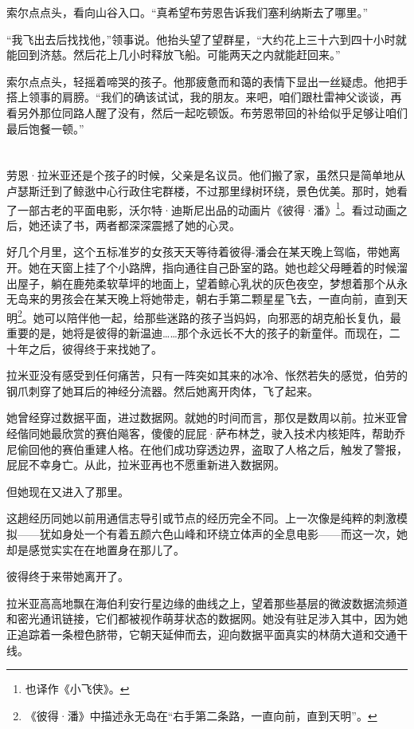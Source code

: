\documentclass[AutoFakeBold=true]{book}
\begin{document}
索尔点点头，看向山谷入口。``真希望布劳恩告诉我们塞利纳斯去了哪里。''

``我飞出去后找找他，''领事说。他抬头望了望群星，``大约花上三十六到四十小时就能回到济慈。然后花上几小时释放飞船。可能两天之内就能赶回来。''

索尔点点头，轻摇着啼哭的孩子。他那疲惫而和蔼的表情下显出一丝疑虑。他把手搭上领事的肩膀。``我们的确该试试，我的朋友。来吧，咱们跟杜雷神父谈谈，再看另外那位同路人醒了没有，然后一起吃顿饭。布劳恩带回的补给似乎足够让咱们最后饱餐一顿。''

\chapter{}

劳恩·拉米亚还是个孩子的时候，父亲是名议员。他们搬了家，虽然只是简单地从卢瑟斯迁到了鲸逖中心行政住宅群楼，不过那里绿树环绕，景色优美。那时，她看了一部古老的平面电影，沃尔特·迪斯尼出品的动画片《彼得·潘》\footnote{也译作《小飞侠》。}。看过动画之后，她还读了书，两者都深深震撼了她的心灵。

好几个月里，这个五标准岁的女孩天天等待着彼得-潘会在某天晚上驾临，带她离开。她在天窗上挂了个小路牌，指向通往自己卧室的路。她也趁父母睡着的时候溜出屋子，躺在鹿苑柔软草坪的地面上，望着鲸心乳状的灰色夜空，梦想着那个从永无岛来的男孩会在某天晚上将她带走，朝右手第二颗星星飞去，一直向前，直到天明\footnote{《彼得·潘》中描述永无岛在``右手第二条路，一直向前，直到天明''。}。她可以陪伴他一起，给那些迷路的孩子当妈妈，向邪恶的胡克船长复仇，最重要的是，她将是彼得的新温迪……那个永远长不大的孩子的新童伴。而现在，二十年之后，彼得终于来找她了。

\vspace*{1em}

拉米亚没有感受到任何痛苦，只有一阵突如其来的冰冷、怅然若失的感觉，伯劳的钢爪刺穿了她耳后的神经分流器。然后她离开肉体，飞了起来。

她曾经穿过数据平面，进过数据网。就她的时间而言，那仅是数周以前。拉米亚曾经偕同她最欣赏的赛伯飚客，傻傻的屁屁·萨布林芝，驶入技术内核矩阵，帮助乔尼偷回他的赛伯重建人格。在他们成功穿透边界，盗取了人格之后，触发了警报，屁屁不幸身亡。从此，拉米亚再也不愿重新进入数据网。

但她现在又进入了那里。

这趟经历同她以前用通信志导引或节点的经历完全不同。上一次像是纯粹的刺激模拟——犹如身处一个有着五颜六色山峰和环绕立体声的全息电影——而这一次，她却是感觉{\kaishu 实实在在地置身在那儿了}。

彼得终于来带她离开了。

拉米亚高高地飘在海伯利安行星边缘的曲线之上，望着那些基层的微波数据流频道和密光通讯链接，它们都被视作萌芽状态的数据网。她没有驻足涉入其中，因为她正追踪着一条橙色脐带，它朝天延伸而去，迎向数据平面{\kaishu 真实的}林荫大道和交通干线。
\end{document}
